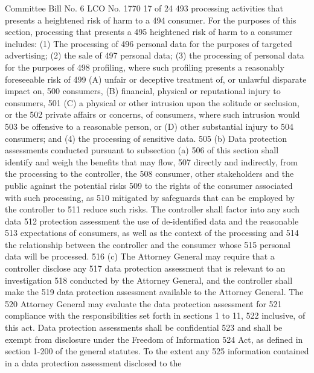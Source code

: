 Committee Bill No. 6
LCO No. 1770 17 of 24
493 processing activities that presents a heightened risk of harm to a
494 consumer. For the purposes of this section, processing that presents a
495 heightened risk of harm to a consumer includes: (1) The processing of
496 personal data for the purposes of targeted advertising; (2) the sale of
497 personal data; (3) the processing of personal data for the purposes of
498 profiling, where such profiling presents a reasonably foreseeable risk of
499 (A) unfair or deceptive treatment of, or unlawful disparate impact on,
500 consumers, (B) financial, physical or reputational injury to consumers,
501 (C) a physical or other intrusion upon the solitude or seclusion, or the
502 private affairs or concerns, of consumers, where such intrusion would
503 be offensive to a reasonable person, or (D) other substantial injury to
504 consumers; and (4) the processing of sensitive data.
505 (b) Data protection assessments conducted pursuant to subsection (a)
506 of this section shall identify and weigh the benefits that may flow,
507 directly and indirectly, from the processing to the controller, the
508 consumer, other stakeholders and the public against the potential risks
509 to the rights of the consumer associated with such processing, as
510 mitigated by safeguards that can be employed by the controller to
511 reduce such risks. The controller shall factor into any such data
512 protection assessment the use of de-identified data and the reasonable
513 expectations of consumers, as well as the context of the processing and
514 the relationship between the controller and the consumer whose
515 personal data will be processed.
516 (c) The Attorney General may require that a controller disclose any
517 data protection assessment that is relevant to an investigation
518 conducted by the Attorney General, and the controller shall make the
519 data protection assessment available to the Attorney General. The
520 Attorney General may evaluate the data protection assessment for
521 compliance with the responsibilities set forth in sections 1 to 11,
522 inclusive, of this act. Data protection assessments shall be confidential
523 and shall be exempt from disclosure under the Freedom of Information
524 Act, as defined in section 1-200 of the general statutes. To the extent any
525 information contained in a data protection assessment disclosed to the 


